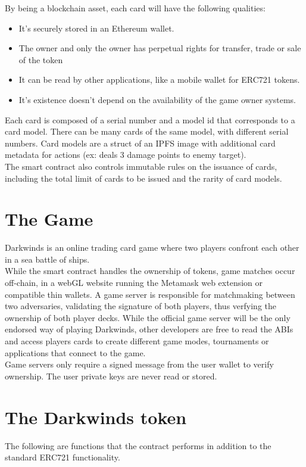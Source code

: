 \documentclass[11pt,twocolumn]{article}
\begin{document}
By being a blockchain asset, each card will have the following qualities:

\begin{itemize}
        \item It's securely stored in an Ethereum wallet.
        \item The owner and only the owner has perpetual rights for transfer, trade or sale of the token
        \item It can be read by other applications, like a mobile wallet for ERC721 tokens.
        \item It's existence doesn't depend on the availability of the game owner systems.
\end{itemize}

Each card is composed of a serial number and a model id that corresponds to a card model. There can be many cards of the same model, with different serial numbers. Card models are a struct of an IPFS image with additional card metadata for actions (ex: deals 3 damage points to enemy target).\\

The smart contract also controls immutable rules on the issuance of cards, including the total limit of cards to be issued and the rarity of card models.


\section{The Game}
Darkwinds is an online trading card game where two players confront each other in a sea battle of ships.\\

While the smart contract handles the ownership of tokens, game matches occur off-chain, in a webGL website running the Metamask web extension or compatible thin wallets. A game server is responsible for matchmaking between two adversaries, validating the signature of both players, thus verfying the ownership of both player decks. While the official game server will be the only endorsed way of playing Darkwinds, other developers are free to read the ABIs and access players cards to create different game modes, tournaments or applications that connect to the game.\\

Game servers only require a signed message from the user wallet to verify ownership. The user private keys are never read or stored.


\section{The Darkwinds token}
The following are functions that the contract performs in addition to the standard ERC721 functionality.
\end{document}
